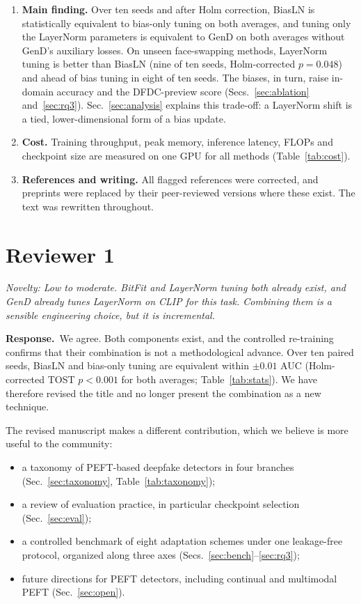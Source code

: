 \documentclass[11pt]{article}
\newenvironment{comment}{\par\medskip\noindent\begin{minipage}{\linewidth}\color{black!70}\itshape}{\end{minipage}\par\smallskip}
\newcommand{\resp}{\noindent\textbf{Response.}~}
\begin{document}
\begin{enumerate}
\item \textbf{Main finding.} Over ten seeds and after Holm correction, BiasLN is statistically equivalent to bias-only tuning on both averages, and tuning only the LayerNorm parameters is equivalent to GenD on both averages without GenD's auxiliary losses. On unseen face-swapping methods, LayerNorm tuning is better than BiasLN (nine of ten seeds, Holm-corrected $p=0.048$) and ahead of bias tuning in eight of ten seeds. The biases, in turn, raise in-domain accuracy and the DFDC-preview score (Secs.~\ref{sec:ablation} and~\ref{sec:rq3}). Sec.~\ref{sec:analysis} explains this trade-off: a LayerNorm shift is a tied, lower-dimensional form of a bias update.
\item \textbf{Cost.} Training throughput, peak memory, inference latency, FLOPs and checkpoint size are measured on one GPU for all methods (Table~\ref{tab:cost}).
\item \textbf{References and writing.} All flagged references were corrected, and preprints were replaced by their peer-reviewed versions where these exist. The text was rewritten throughout.
\end{enumerate}

\section*{Reviewer 1}

\begin{comment}
Novelty: Low to moderate. BitFit and LayerNorm tuning both already exist, and GenD already tunes LayerNorm on CLIP for this task. Combining them is a sensible engineering choice, but it is incremental.
\end{comment}
\resp We agree. Both components exist, and the controlled re-training confirms that their combination is not a methodological advance. Over ten paired seeds, BiasLN and bias-only tuning are equivalent within $\pm0.01$ AUC (Holm-corrected TOST $p<0.001$ for both averages; Table~\ref{tab:stats}). We have therefore revised the title and no longer present the combination as a new technique.

The revised manuscript makes a different contribution, which we believe is more useful to the community:
\begin{itemize}
\item a taxonomy of PEFT-based deepfake detectors in four branches (Sec.~\ref{sec:taxonomy}, Table~\ref{tab:taxonomy});
\item a review of evaluation practice, in particular checkpoint selection (Sec.~\ref{sec:eval});
\item a controlled benchmark of eight adaptation schemes under one leakage-free protocol, organized along three axes (Secs.~\ref{sec:bench}--\ref{sec:rq3});
\item future directions for PEFT detectors, including continual and multimodal PEFT (Sec.~\ref{sec:open}).
\end{itemize}
\end{document}
